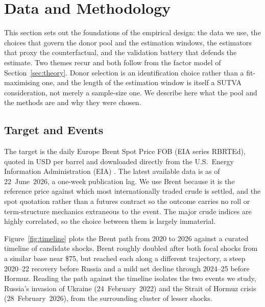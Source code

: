 \section{Data and Methodology}\label{sec:data}
This section sets out the foundations of the empirical design: the data we use, the
choices that govern the donor pool and the estimation windows, the estimators that
proxy the counterfactual, and the validation battery that defends the estimate. Two
themes recur and both follow from the factor model of Section~\ref{sec:theory}. Donor
selection is an identification choice rather than a fit-maximising one, and the length
of the estimation window is itself a SUTVA consideration, not merely a sample-size one.
We describe here what the pool and the methods are and why they were
chosen.

\subsection{Target and Events}
The target is the daily Europe Brent Spot Price FOB (EIA series RBRTEd), quoted in USD
per barrel and downloaded directly from the U.S.\ Energy Information Administration (EIA)
\citep{eia_brent}. The latest available data is as of 22~June~2026, a one-week publication lag.
We use Brent because it is the reference price against which most internationally traded
crude is settled, and the spot quotation rather than a futures contract so the outcome
carries no roll or term-structure mechanics extraneous to the event. The major crude
indices are highly correlated, so the choice between them is largely immaterial.

Figure~\ref{fig:timeline} plots the Brent path from 2020 to 2026 against a curated
timeline of candidate shocks. Brent roughly doubled after both focal shocks from a similar base near \$75, but reached each along a different trajectory, a steep 2020--22
recovery before Russia and a mild net decline through 2024--25 before Hormuz. Reading the
path against the timeline isolates the two events we study, Russia's invasion of Ukraine
(24~February~2022) and the Strait of Hormuz crisis (28~February~2026), from the
surrounding cluster of lesser shocks.


